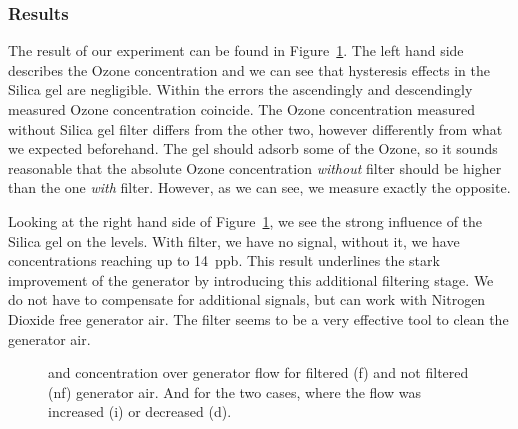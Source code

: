 \subsubsection{Results}
\label{sec:silica-results}

The result of our experiment can be found in
Figure~\ref{fig:o3-flow}. The left hand side describes the Ozone
concentration and we can see that hysteresis effects in the Silica gel
are negligible. Within the errors the ascendingly and descendingly
measured Ozone concentration coincide. The Ozone concentration
measured without Silica gel filter differs from the other two, however
differently from what we expected beforehand. The gel should adsorb
some of the Ozone, so it sounds reasonable that the absolute Ozone
concentration \emph{without} filter should be higher than the one
\emph{with} filter. However, as we can see, we measure exactly the
opposite. 

Looking at the right hand side of Figure~\ref{fig:o3-flow}, we see the
strong influence of the Silica gel on the  levels. With
filter, we have no  signal, without it, we have concentrations
reaching up to \SI{14}{ppb}. This result underlines the stark
improvement of the generator by introducing this additional filtering
stage. We do not have to compensate for additional  signals,
but can work with Nitrogen Dioxide free generator air. The filter
seems to be a very effective tool to clean the generator air.

\begin{figure}[htbp]
  \centering
  
  \hfill
  
  \caption{ and  concentration over generator flow for
    filtered (f) and not filtered (nf) generator air. And for the two
    cases, where the flow was increased (i) or decreased (d).}
  \label{fig:o3-flow}
\end{figure}

